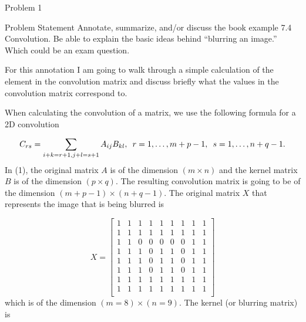 \begin{problem}{Problem 1}
    \begin{statement}{Problem Statement}
        Annotate, summarize, and/or discuss the book example 7.4 Convolution. Be able to explain the basic ideas behind “blurring an image.” Which could be an exam question.
    \end{statement}

    \begin{Highlight}[Solution]
        For this annotation I am going to walk through a simple calculation of the element in the convolution matrix and discuss briefly what the values in the convolution matrix correspond to. \vspace*{1em}

        When calculating the convolution of a matrix, we use the following formula for a 2D convolution

        \setcounter{equation}{0}
        \begin{equation}
            C_{rs} = \sum_{i + k = r + 1, j + l = s + 1} A_{ij}B_{kl}, \hspace*{5pt} r = 1, \dots, m + p - 1, \hspace*{5pt} s = 1, \dots, n + q - 1.
        \end{equation}
        In (1), the original matrix $A$ is of the dimension $(m \times n)$ and the kernel matrix $B$ is of the dimension $(p \times q)$. The resulting convolution matrix is going to be of the dimension 
        $(m + p - 1) \times (n + q - 1)$. The original matrix $X$ that represents the image that is being blurred is

        \begin{equation}
            X = 
            \begin{bmatrix}
                1 & 1 & 1 & 1 & 1 & 1 & 1 & 1 & 1 \\
                1 & 1 & 1 & 1 & 1 & 1 & 1 & 1 & 1 \\
                1 & 1 & 0 & 0 & 0 & 0 & 0 & 1 & 1 \\
                1 & 1 & 1 & 0 & 1 & 1 & 0 & 1 & 1 \\
                1 & 1 & 1 & 0 & 1 & 1 & 0 & 1 & 1 \\
                1 & 1 & 1 & 0 & 1 & 1 & 0 & 1 & 1 \\
                1 & 1 & 1 & 1 & 1 & 1 & 1 & 1 & 1 \\
                1 & 1 & 1 & 1 & 1 & 1 & 1 & 1 & 1 \\
            \end{bmatrix}
        \end{equation}
        which is of the dimension $(m = 8) \times (n = 9)$. The kernel (or blurring matrix) is 


\end{Highlight}
\end{problem}

